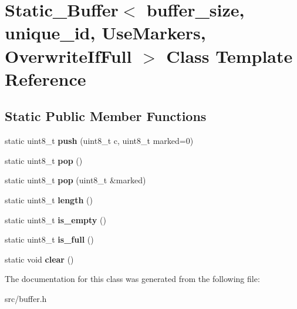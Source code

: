\hypertarget{classStatic__Buffer}{}\section{Static\+\_\+\+Buffer$<$ buffer\+\_\+size, unique\+\_\+id, Use\+Markers, Overwrite\+If\+Full $>$ Class Template Reference}
\label{classStatic__Buffer}
\subsection*{Static Public Member Functions}
\begin{DoxyCompactItemize}
\item 
static uint8\+\_\+t {\bfseries push} (uint8\+\_\+t c, uint8\+\_\+t marked=0)\hypertarget{classStatic__Buffer_ac4c67ff57fef1ed15e10f52f5c932dfb}{}\label{classStatic__Buffer_ac4c67ff57fef1ed15e10f52f5c932dfb}

\item 
static uint8\+\_\+t {\bfseries pop} ()\hypertarget{classStatic__Buffer_ad8c14c6521d6473431a3ee0ce1ca8870}{}\label{classStatic__Buffer_ad8c14c6521d6473431a3ee0ce1ca8870}

\item 
static uint8\+\_\+t {\bfseries pop} (uint8\+\_\+t \&marked)\hypertarget{classStatic__Buffer_a0a23b75e95db16858f25697bd52acb13}{}\label{classStatic__Buffer_a0a23b75e95db16858f25697bd52acb13}

\item 
static uint8\+\_\+t {\bfseries length} ()\hypertarget{classStatic__Buffer_ad3748280942bfc275e52df95f310b0e8}{}\label{classStatic__Buffer_ad3748280942bfc275e52df95f310b0e8}

\item 
static uint8\+\_\+t {\bfseries is\+\_\+empty} ()\hypertarget{classStatic__Buffer_ae9f38e912e9d77fa18a675ac6e22765f}{}\label{classStatic__Buffer_ae9f38e912e9d77fa18a675ac6e22765f}

\item 
static uint8\+\_\+t {\bfseries is\+\_\+full} ()\hypertarget{classStatic__Buffer_ae5a31c4d47525f127870478f2cf937f8}{}\label{classStatic__Buffer_ae5a31c4d47525f127870478f2cf937f8}

\item 
static void {\bfseries clear} ()\hypertarget{classStatic__Buffer_abfb1a89519c9f90fb7490cebbf028304}{}\label{classStatic__Buffer_abfb1a89519c9f90fb7490cebbf028304}

\end{DoxyCompactItemize}


The documentation for this class was generated from the following file\+:\begin{DoxyCompactItemize}
\item 
src/buffer.\+h\end{DoxyCompactItemize}
